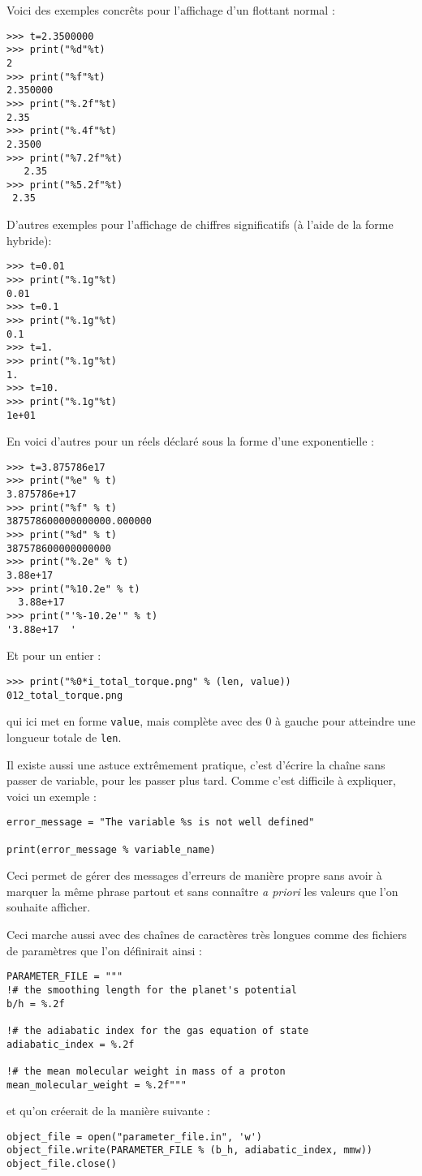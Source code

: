 \documentclass[a4paper,twoside]{article}
\begin{document}
\bigskip

Voici des exemples concrêts pour l'affichage d'un flottant normal : 
\begin{verbatim}
>>> t=2.3500000
>>> print("%d"%t)
2
>>> print("%f"%t)
2.350000
>>> print("%.2f"%t)
2.35
>>> print("%.4f"%t)
2.3500
>>> print("%7.2f"%t)
   2.35
>>> print("%5.2f"%t)
 2.35
\end{verbatim}

D'autres exemples pour l'affichage de chiffres significatifs (à l'aide de la forme hybride): 
\begin{verbatim}
>>> t=0.01
>>> print("%.1g"%t)
0.01
>>> t=0.1
>>> print("%.1g"%t)
0.1
>>> t=1.
>>> print("%.1g"%t)
1.
>>> t=10.
>>> print("%.1g"%t)
1e+01
\end{verbatim}

En voici d'autres pour un réels déclaré sous la forme d'une exponentielle :
\begin{verbatim}
>>> t=3.875786e17
>>> print("%e" % t)
3.875786e+17
>>> print("%f" % t)
387578600000000000.000000
>>> print("%d" % t)
387578600000000000
>>> print("%.2e" % t)
3.88e+17
>>> print("%10.2e" % t)
  3.88e+17
>>> print("'%-10.2e'" % t)
'3.88e+17  '
\end{verbatim}

Et pour un entier :
\begin{verbatim}
>>> print("%0*i_total_torque.png" % (len, value))
012_total_torque.png
\end{verbatim}
qui ici met en forme \texttt{value}, mais complète avec des 0 à gauche pour atteindre une longueur totale de \texttt{len}.

\bigskip

Il existe aussi une astuce extrêmement pratique, c'est d'écrire la chaîne sans passer de variable, pour les passer plus tard. Comme c'est difficile à expliquer, voici un exemple : 
\begin{verbatim}
error_message = "The variable %s is not well defined" 

print(error_message % variable_name)
\end{verbatim}
Ceci permet de gérer des messages d'erreurs de manière propre sans avoir à marquer la même phrase partout et sans connaître \textit{a priori} les valeurs que l'on souhaite afficher. 

Ceci marche aussi avec des chaînes de caractères très longues comme des fichiers de paramètres que l'on définirait ainsi : 
\begin{verbatim}
PARAMETER_FILE = """
!# the smoothing length for the planet's potential
b/h = %.2f

!# the adiabatic index for the gas equation of state
adiabatic_index = %.2f

!# the mean molecular weight in mass of a proton
mean_molecular_weight = %.2f"""
\end{verbatim}
et qu'on créerait de la manière suivante : 
\begin{verbatim}
object_file = open("parameter_file.in", 'w')
object_file.write(PARAMETER_FILE % (b_h, adiabatic_index, mmw))
object_file.close()
\end{verbatim}
\end{document}

